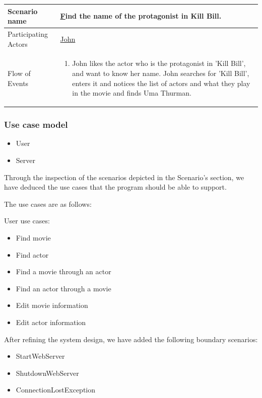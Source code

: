 \begin{center}
	\begin{tabular}{ | l | p{10cm} |  }
		 \hline
		Scenario name & \underline Find the name of the protagonist in Kill Bill.  \\ \hline
		Participating Actors & \underline{John} \\ \hline
		Flow of Events & \begin{enumerate}
						\item John likes the actor who is the protagonist in 'Kill Bill', and want to know her name.
						John searches for 'Kill Bill', enters it and notices the list of actors and what they play in the movie and finds Uma Thurman.
						\end{enumerate}
						\\ \hline
	\end{tabular}
\end{center}

\subsubsection{Use case model}

\begin{itemize}
	\setlength{\itemsep}{-5pt}
	\item User
	\item Server
\end{itemize}

Through the inspection of the scenarios depicted in the Scenario’s section, we have deduced the use cases that the program should be able to support.

The use cases are as follows:

User use cases:
\begin{itemize}
	\setlength{\itemsep}{-5pt}
	\item Find movie
	\item Find actor
	\item Find a movie through an actor
	\item Find an actor through a movie
	\item Edit movie information
	\item Edit actor information
\end{itemize}

After refining the system design, we have added the following boundary scenarios:
\begin{itemize}
	\setlength{\itemsep}{-5pt}
	
	\item StartWebServer
	\item ShutdownWebServer
	\item ConnectionLostException
\end{itemize}

